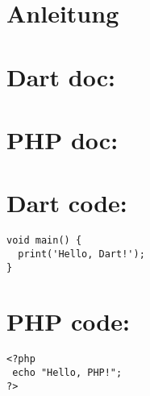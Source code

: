 \documentclass{article}
\begin{document}
\section{Anleitung}
\section{Dart doc:}

\section{PHP doc:}

\section{Dart code:}
\begin{verbatim}
void main() {
  print('Hello, Dart!');
}
\end{verbatim}

\section{PHP code:}
\begin{verbatim}
<?php
 echo "Hello, PHP!";
?>
\end{verbatim}
\end{document}
